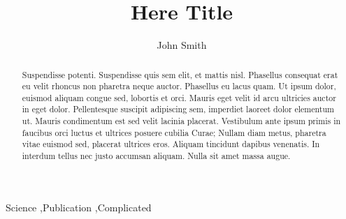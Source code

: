 \documentclass[preprint,12pt]{elsarticle}
\begin{document}
\begin{frontmatter}


\title{Here Title}




\author{John Smith}

\address{California, United States}

\begin{abstract}
Suspendisse potenti. Suspendisse quis sem elit, et mattis nisl. Phasellus consequat erat eu velit rhoncus non pharetra neque auctor. Phasellus eu lacus quam. Ut ipsum dolor, euismod aliquam congue sed, lobortis et orci. Mauris eget velit id arcu ultricies auctor in eget dolor. Pellentesque suscipit adipiscing sem, imperdiet laoreet dolor elementum ut. Mauris condimentum est sed velit lacinia placerat. Vestibulum ante ipsum primis in faucibus orci luctus et ultrices posuere cubilia Curae; Nullam diam metus, pharetra vitae euismod sed, placerat ultrices eros. Aliquam tincidunt dapibus venenatis. In interdum tellus nec justo accumsan aliquam. Nulla sit amet massa augue.
\end{abstract}

\begin{keyword}
Science \sep Publication \sep Complicated


\end{keyword}

\end{frontmatter}
\end{document}
